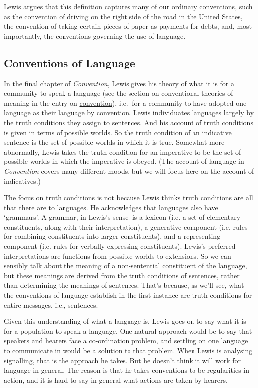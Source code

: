 Lewis argues that this definition captures many of our ordinary conventions, such as the convention of driving on the right side of the road in the United States, the convention of taking certain pieces of paper as payments for debts, and, most importantly, the conventions governing the use of language.

\subsection{Conventions of Language} 
In the final chapter of \textit{Convention}, Lewis gives his theory of what it is for a community to speak a language (see the section on conventional theories of meaning in the entry on \href{http://plato.stanford.edu/convention/index.html#ConTheMea}{convention}), i.e., for a community to have adopted one language as their language by convention. Lewis individuates languages largely by the truth conditions they assign to sentences. And his account of truth conditions is given in terms of possible worlds. So the truth condition of an indicative sentence is the set of possible worlds in which it is true. Somewhat more abnormally, Lewis takes the truth condition for an imperative to be the set of possible worlds in which the imperative is obeyed. (The account of language in \textit{Convention} covers many different moods, but we will focus here on the account of indicatives.)

The focus on truth conditions is not because Lewis thinks truth conditions are all that there are to languages. He acknowledges that languages also have `grammars'. A grammar, in Lewis's sense, is a lexicon (i.e. a set of elementary constituents, along with their interpretation), a generative component (i.e. rules for combining constituents into larger constituents), and a representing component (i.e. rules for verbally expressing constituents). Lewis's preferred interpretations are functions from possible worlds to extensions. So we can sensibly talk about the meaning of a non-sentential constituent of the language, but these meanings are derived from the truth conditions of sentences, rather than determining the meanings of sentences. That's because, as we'll see, what the conventions of language establish in the first instance are truth conditions for entire messages, i.e., sentences.

Given this understanding of what a language is, Lewis goes on to say what it is for a population to speak a language. One natural approach would be to say that speakers and hearers face a co-ordination problem, and settling on one language to communicate in would be a solution to that problem. When Lewis is analysing signalling, that is the approach he takes. But he doesn't think it will work for language in general. The reason is that he takes conventions to be regularities in action, and it is hard to say in general what actions are taken by hearers.

